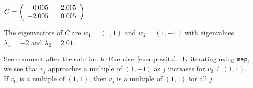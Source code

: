 \documentclass{ximera}
\begin{document}
\begin{computerExercise}  \label{exer:powitc}
$C=\left(\begin{array}{rr} 0.005 & -2.005\\ -2.005 &0.005\end{array}\right)$

\begin{solution}

\ans The eigenvectors of $C$ are $w_1 = (1,1)$ and $w_2 = (1,-1)$ with 
eigenvalues $\lambda_1 = -2$ and $\lambda_2 = 2.01$.  

\soln See comment after the solution to Exercise~\ref{exer:powita}.
By iterating using {\tt map}, we see that $v_j$ approaches a multiple
of $(1,-1)$ as $j$ increases for $v_0 \neq (1,1)$.  If $v_0$ is a
multiple of $(1,1)$, then $v_j$ is a multiple of $(1,1)$ for all $j$.

\end{solution}
\end{computerExercise}
\end{document}
